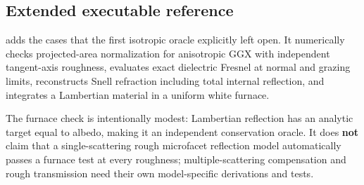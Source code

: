\subsection{Extended executable reference}\label{appendix-885c1cb64ae9-extended-executable-reference}

\hypertarget{appendix-885c1cb64ae9-extended-executable-reference}{}

 adds the cases that the first isotropic oracle explicitly left open. It numerically checks projected-area normalization for anisotropic GGX with independent tangent-axis roughness, evaluates exact dielectric Fresnel at normal and grazing limits, reconstructs Snell refraction including total internal reflection, and integrates a Lambertian material in a uniform white furnace.

The furnace check is intentionally modest: Lambertian reflection has an analytic target equal to albedo, making it an independent conservation oracle. It does \textbf{not} claim that a single-scattering rough microfacet reflection model automatically passes a furnace test at every roughness; multiple-scattering compensation and rough transmission need their own model-specific derivations and tests.

